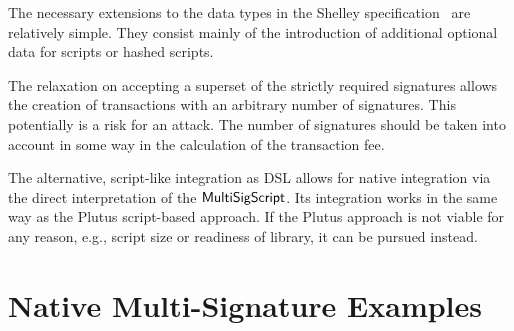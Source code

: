 \documentclass[11pt,a4paper,dvipsnames]{article}
\theoremstyle{definition}
\begin{document}
The necessary extensions to the data types in the Shelley
specification~\cite{shelley_formal_spec} are relatively simple. They consist
mainly of the introduction of additional optional data for scripts or hashed
scripts.

The relaxation on accepting a superset of the strictly required signatures
allows the creation of transactions with an arbitrary number of signatures. This
potentially is a risk for an attack. The number of signatures should be taken
into account in some way in the calculation of the transaction fee.

The alternative, script-like integration as DSL allows for native integration
via the direct interpretation of the $\mathsf{MultiSigScript}$. Its integration
works in the same way as the Plutus script-based approach. If the Plutus
approach is not viable for any reason, e.g., script size or readiness of
library, it can be pursued instead.



\appendix

\section{Native Multi-Signature Examples}
\label{sec:native-multi-sign}
\end{document}
